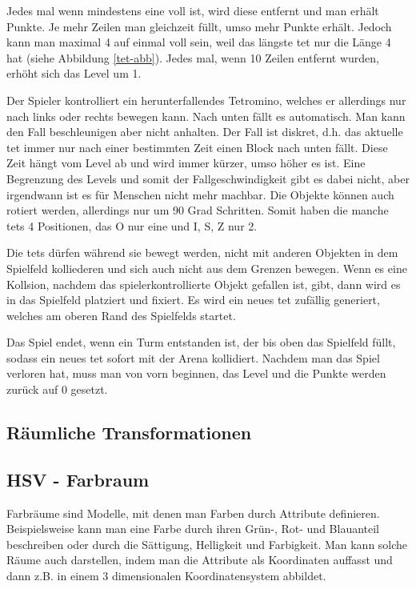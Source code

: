 \documentclass[11pt]{article}
\newcommand{\refabb}[1]{Abbildung \ref{#1}}
\begin{document}
Jedes mal wenn mindestens eine voll ist, wird diese entfernt und man erhält Punkte.
Je mehr Zeilen man gleichzeit füllt, umso mehr Punkte erhält. Jedoch kann man maximal 4 auf einmal voll sein, weil das längste \gls{tet} 
nur die Länge 4 hat (siehe \refabb{tet-abb}). Jedes mal, wenn 10 Zeilen entfernt wurden, erhöht sich das Level um 1.\cite{TetrisWiki}

Der Spieler kontrolliert ein herunterfallendes Tetromino, welches er allerdings nur nach links oder rechts bewegen kann.
Nach unten fällt es automatisch. Man kann den Fall beschleunigen aber nicht anhalten. 
Der Fall ist diskret, d.h. das aktuelle \gls{tet} immer nur nach einer bestimmten Zeit einen Block nach unten fällt.
Diese Zeit hängt vom Level ab und wird immer kürzer, umso höher es ist. Eine Begrenzung des Levels und somit der Fallgeschwindigkeit gibt es dabei nicht,
aber irgendwann ist es für Menschen nicht mehr machbar.
Die Objekte können auch rotiert werden, allerdings nur um 90 Grad Schritten. Somit haben die manche \glspl{tet} 4 Positionen, das O nur eine und I, S, Z nur 2.

Die \glspl{tet} dürfen während sie bewegt werden, nicht mit anderen Objekten in dem Spielfeld kolliederen und sich auch nicht aus dem Grenzen bewegen.
Wenn es eine Kollsion, nachdem das spielerkontrollierte Objekt gefallen ist, gibt, dann wird es in das Spielfeld platziert und fixiert. Es wird ein neues \gls{tet} 
zufällig generiert, welches am oberen Rand des Spielfelds startet.

Das Spiel endet, wenn ein Turm entstanden ist, der bis oben das Spielfeld füllt, sodass ein neues \gls{tet} sofort mit der Arena kollidiert.
Nachdem man das Spiel verloren hat, muss man von vorn beginnen, das Level und die Punkte werden zurück auf 0 gesetzt.

\subsection{Räumliche Transformationen}

\subsection{HSV - Farbraum}

Farbräume sind Modelle, mit denen man Farben durch Attribute definieren. 
Beispielsweise kann man eine Farbe durch ihren Grün-, Rot- und Blauanteil beschreiben oder 
durch die Sättigung, Helligkeit und Farbigkeit. Man kann solche Räume auch darstellen, indem man 
die Attribute als Koordinaten auffasst und dann z.B. in einem 3 dimensionalen Koordinatensystem abbildet. 
\cite{CS1}
\end{document}
